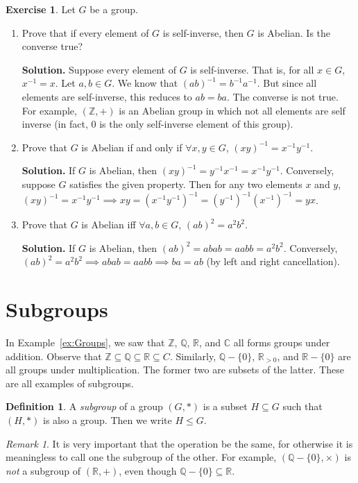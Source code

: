 \documentclass[svgnames]{article}
\theoremstyle{definition}
\newtheorem{Definition}[Theorem]{Definition}
\newtheorem{Exercise}{Exercise}[section]
\theoremstyle{remark}
\newtheorem*{Remark*}{Remark}
\begin{document}
\begin{Exercise}
Let $G$ be a group.
\begin{enumerate}
\item\label{it:Ord2=>Abelian} Prove that if every element of $G$ is self-inverse, then $G$ is Abelian. Is the converse true?

\textbf{Solution.} Suppose every element of $G$ is self-inverse. That is, for all $x \in G$, $x^{-1} = x$. Let $a, b \in G$. We know that $(ab)^{-1} = b^{-1} a^{-1}$. But since all elements are self-inverse, this reduces to $ab = ba$. The converse is not true. For example, $(\mathbb Z, +)$ is an Abelian group in which not all elements are self inverse (in fact, $0$ is the only self-inverse element of this group).

\item Prove that $G$ is Abelian if and only if $\forall x, y \in G$, $(xy)^{-1} = x^{-1}y^{-1}$.

\textbf{Solution.} If $G$ is Abelian, then $(xy)^{-1} = y^{-1} x^{-1} = x^{-1} y^{-1}$. Conversely, suppose $G$ satisfies the given property. Then for any two elements $x$ and $y$, $(xy)^{-1} = x^{-1} y^{-1} \implies xy = (x^{-1} y^{-1})^{-1} = (y^{-1})^{-1} (x^{-1})^{-1} = yx$.

\item Prove that $G$ is Abelian iff $\forall a, b \in G$, $(ab)^2 = a^2 b^2$.

\textbf{Solution.} If $G$ is Abelian, then $(ab)^2 = abab = aabb = a^2b^2$. Conversely, $(ab)^2 = a^2 b^2 \implies abab = aabb \implies ba = ab$ (by left and right cancellation).
\end{enumerate}
\end{Exercise}

\section{Subgroups}\label{sec:Subgroups}
In Example~\ref{ex:Groups}, we saw that $\mathbb Z$, $\mathbb Q$, $\mathbb R$, and $\mathbb C$ all forms groups under addition. Observe that $\mathbb Z \subseteq \mathbb Q \subseteq \mathbb R \subseteq C$. Similarly, $\mathbb Q - \{0\}$, $\mathbb R_{>0}$, and $\mathbb R - \{0\}$ are all groups under multiplication. The former two are subsets of the latter. These are all examples of subgroups.
\begin{Definition}\label{def:Subgroup}
A \emph{subgroup} of a group $(G, *)$ is a subset $H \subseteq G$ such that $(H, *)$ is also a group. Then we write $H \le G$.
\end{Definition}
\begin{Remark*}
It is very important that the operation be the same, for otherwise it is meaningless to call one the subgroup of the other. For example, $(\mathbb Q - \{0\}, \times)$ is \textit{not} a subgroup of $(\mathbb R, +)$, even though $\mathbb Q - \{0\} \subseteq \mathbb R$.
\end{Remark*}
\end{document}
